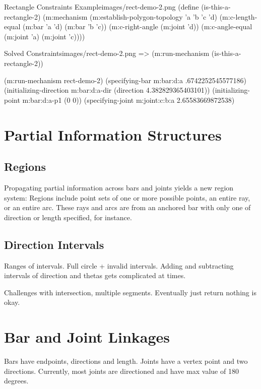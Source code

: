 \begin{code-example}{Rectangle Constraints Example}{images/rect-demo-2.png}
(define (is-this-a-rectangle-2)
  (m:mechanism
   (m:establish-polygon-topology 'a 'b 'c 'd)
   (m:c-length-equal (m:bar 'a 'd)
                     (m:bar 'b 'c))
   (m:c-right-angle (m:joint 'd))
   (m:c-angle-equal (m:joint 'a)
                    (m:joint 'c))))
\end{code-example}

\begin{img-example}{Solved Constraints}{images/rect-demo-2.png}
=> (m:run-mechanism (is-this-a-rectangle-2))

(m:run-mechanism rect-demo-2)
(specifying-bar m:bar:d:a .6742252545577186)
(initializing-direction m:bar:d:a-dir (direction 4.382829365403101))
(initializing-point m:bar:d:a-p1 (0 0))
(specifying-joint m:joint:c:b:a 2.65583669872538)
\end{img-example}

\section{Partial Information Structures}

\subsection{Regions}

Propagating partial information across bars and joints yields a new
region system: Regions include point sets of one or more possible
points, an entire ray, or an entire arc. These rays and arcs are
from an anchored bar with only one of direction or length specified,
for instance.

\subsection{Direction Intervals}

Ranges of intervals. Full circle + invalid intervals. Adding and
subtracting intervals of direction and thetas gets complicated at times.

Challenges with intersection, multiple segments. Eventually just
return nothing is okay.

\section{Bar and Joint Linkages}

Bars have endpoints, directions and length. Joints have a vertex point
and two directions. Currently, most joints are directioned and have
max value of 180 degrees.

